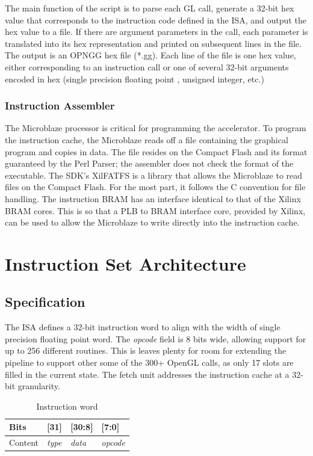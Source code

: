 \documentclass[letterpaper,10pt]{article}
\begin{document}
The main function of the script is to parse each GL call, generate a 32-bit hex value that corresponds to the instruction code defined in the ISA, and output the hex value to a file. If there are argument parameters in the call, each parameter is translated into its hex representation and printed on subsequent lines in the file. The output is an OPNGG hex file (*.gg). Each line of the file is one hex value, either corresponding to an instruction call or one of several 32-bit arguments encoded in hex (single precision floating point , unsigned integer, etc.)

\subsubsection{Instruction Assembler}
The Microblaze processor is critical for programming the accelerator.  To program the instruction cache, the Microblaze reads off a file containing the graphical program and copies in data.  The file resides on the Compact Flash and its format guaranteed by the Perl Parser; the assembler does not check the format of the executable.  The SDK's XilFATFS is a library that allows the Microblaze to read files on the Compact Flash.  For the most part, it follows the C convention for file handling.  The instruction BRAM has an interface identical to that of the Xilinx BRAM cores.  This is so that a PLB to BRAM interface core, provided by Xilinx, can be used to allow the Microblaze to write directly into the instruction cache.  


\section{Instruction Set Architecture}

\subsection{Specification}

The ISA defines a 32-bit instruction word to align with the width of single precision floating point word. The \emph{opcode} field is 8 bits wide, allowing support for up to 256 different routines. This is leaves plenty for room for extending the pipeline to support other some of the 300+ OpenGL calls, as only 17 slots are filled in the current state. The fetch unit addresses the instruction cache at a 32-bit granularity.

\begin{table}[h]
\begin{center}
\begin{tabular}{ | l | l | l | l |}
\hline
Bits & [31] & [30:8] & [7:0] \\ \hline
Content & \emph{type} & \emph{data} & \emph{opcode} \\ \hline
\end{tabular}
\end{center}
\caption{Instruction word}
\end{table}
\end{document}
